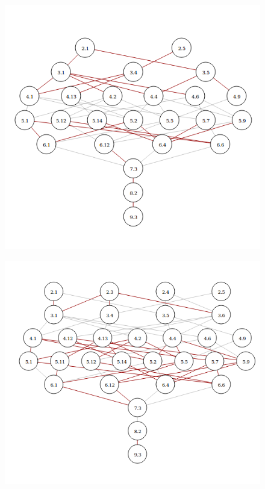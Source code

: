 \documentclass[12pt,twoside]{reedthesis}
\begin{document}
  \begin{figure}[h!tbp]
  \centering
  \includegraphics[angle = 0,scale = 0.6]{conclusion/SolocirculosPRA.png}
  \caption[Positive increments on PRA]{\footnotesize{}}
  \label{fig:PRARutas}
  \end{figure}
  
  \begin{figure}[h!tbp]
  \centering
  \includegraphics[angle = 0,scale = 0.6]{conclusion/SolocirculosPRO.png}
  \caption[Positive increments on ProFAR]{\footnotesize{}}
  \label{fig:ProFARRutas}
  \end{figure}
  
\end{document}
